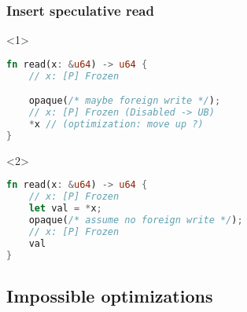 \begin{frame}[fragile, t]
    \frametitle{{\cmark} Insert speculative read}
    \begin{onlyenv}<1>
        \begin{block}{}
            \begin{lstlisting}[language=rust]
fn read(x: &u64) -> u64 {
    // x: [P] Frozen

    opaque(/* maybe foreign write */);
    // x: [P] Frozen (Disabled -> UB)
    *x // (optimization: move up ?)
}
            \end{lstlisting}
        \end{block}
    \end{onlyenv}

    \begin{onlyenv}<2>
        \begin{block}{}
            \begin{lstlisting}[language=rust]
fn read(x: &u64) -> u64 {
    // x: [P] Frozen
    let val = *x;
    opaque(/* assume no foreign write */);
    // x: [P] Frozen
    val
}
            \end{lstlisting}
        \end{block}
    \end{onlyenv}
\end{frame}

\subsection{Impossible optimizations}

